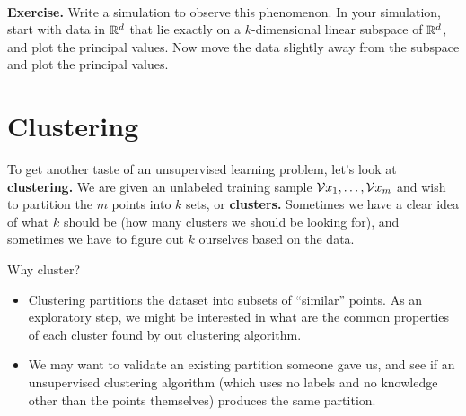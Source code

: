 ~\\
{\bf Exercise.} Write a simulation to observe this phenomenon. In your
simulation, start with data in $\mathbb{R}^d$ that lie exactly on a $k$-dimensional
linear subspace of $\mathbb{R}^d$, and plot the principal values. Now move the data
slightly away from the subspace and plot the principal values. 

\section{Clustering}

To get another taste of an unsupervised learning problem, let's look at {\bf
clustering.} We are given
an unlabeled training sample $\mathcal{V}{x}_1,\ldots,\mathcal{V}{x}_m$ and wish to partition 
the $m$ points into $k$ sets, or {\bf clusters.} Sometimes we have a clear idea
of what $k$ should be (how many clusters we should be looking for), and
sometimes we have to figure out $k$ ourselves based on the data.

Why cluster?
\begin{itemize}
  \item Clustering partitions the dataset into subsets of ``similar'' points. As
    an exploratory step, we might be interested in what are the common
    properties of each cluster found by out clustering algorithm.
  \item We may want to validate an existing partition someone gave us, and see
    if an unsupervised clustering algorithm (which uses no labels and no
    knowledge other than the points themselves) produces the same partition.
\end{itemize}

